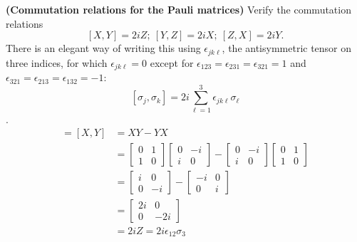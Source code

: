  \textbf{(Commutation relations for the Pauli matrices)} Verify the commutation relations $$[X, Y] = 2iZ;\ [Y, Z] = 2iX;\ [Z,X] = 2iY.$$ There is an elegant way of writing this using $\epsilon_{jk\ell}$, the antisymmetric tensor on three indices, for which $\epsilon_{jk\ell}=0$ except for $\epsilon_{123} = \epsilon_{231}=\epsilon_{321} = 1$ and $\epsilon_{321}=\epsilon_{213}=\epsilon_{132}=-1$: $$[\sigma_j,\sigma_k] = 2i\sum_{\ell=1}^3\epsilon_{jk\ell}\sigma_\ell$$.
\Soln
\begin{align*}
	[\sigma_1,\sigma_2] = \left[X, Y \right] &=XY - YX\\
		&= \begin{bmatrix}
		0 & 1 \\
		1 & 0
		\end{bmatrix}
		\begin{bmatrix}
		0 & -i \\
		i & 0
		\end{bmatrix}
		-
		\begin{bmatrix}
		0 & -i \\
		i & 0
		\end{bmatrix}
		\begin{bmatrix}
		0 & 1 \\
		1 & 0
		\end{bmatrix} \\
%
		&=
%
		\begin{bmatrix}
			i & 0 \\
			0 & -i
		\end{bmatrix}
		-
		\begin{bmatrix}
			-i & 0 \\
			0 & i
		\end{bmatrix}\\
%
		&=
%
		\begin{bmatrix}
			2i & 0 \\
			0 & -2i
		\end{bmatrix} \\
%
		&=	2i Z = 2i\epsilon_{12}\sigma_3
\end{align*}



